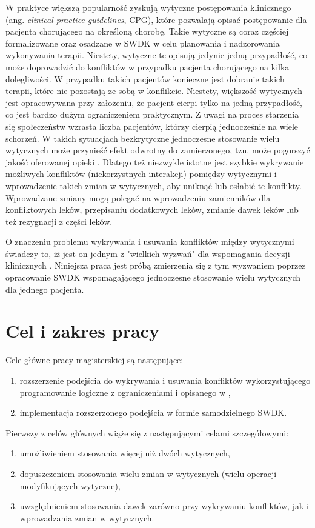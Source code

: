 \begin{spacing}{1.5}
W praktyce większą popularność zyskują wytyczne postępowania klinicznego (ang. \textit{clinical practice guidelines}, CPG), które pozwalają opisać postępowanie dla pacjenta chorującego na określoną chorobę. Takie wytyczne są coraz częściej formalizowane oraz osadzane w SWDK w celu planowania i nadzorowania wykonywania terapii. Niestety, wytyczne te opisują jedynie jedną przypadłość, co może doprowadzić do konfliktów w przypadku pacjenta chorującego na kilka dolegliwości. W przypadku takich pacjentów konieczne jest dobranie takich terapii, które nie pozostają ze sobą w konflikcie. Niestety, większość wytycznych jest opracowywana przy założeniu, że pacjent cierpi tylko na jedną przypadłość, co jest bardzo dużym ograniczeniem praktycznym. Z uwagi na proces starzenia się społeczeństw wzrasta liczba pacjentów, którzy cierpią jednocześnie na wiele schorzeń. W takich sytuacjach bezkrytyczne jednoczesne stosowanie wielu wytycznych może przynieść efekt odwrotny do zamierzonego, tzn. może pogorszyć jakość oferowanej opieki \cite{Boyd05}. Dlatego też niezwykle istotne jest szybkie wykrywanie możliwych konfliktów (niekorzystnych interakcji) pomiędzy wytycznymi i wprowadzenie takich zmian w wytycznych, aby uniknąć lub osłabić te konflikty. Wprowadzane zmiany mogą polegać na wprowadzeniu zamienników dla konfliktowych leków, przepisaniu dodatkowych leków, zmianie dawek leków lub też rezygnacji z części leków.

O znaczeniu problemu wykrywania i usuwania konfliktów między wytycznymi świadczy to, iż jest on jednym z "wielkich wyzwań" dla wspomagania decyzji klinicznych \cite{Sittig08}. Niniejsza praca jest próbą zmierzenia się z tym wyzwaniem poprzez opracowanie SWDK  wspomagającego jednoczesne stosowanie wielu wytycznych dla jednego pacjenta. 


\section{Cel i zakres pracy}

Cele główne pracy magisterskiej są następujące:
\begin{enumerate}
\item rozszerzenie podejścia do wykrywania i usuwania konfliktów wykorzystującego programowanie logiczne z ograniczeniami i opisanego w \cite{SzWilk2},
\item implementacja rozszerzonego podejścia w formie samodzielnego SWDK.
\end{enumerate}

Pierwszy z celów głównych wiąże się z następującymi celami szczegółowymi:
\begin{enumerate}
\item umożliwieniem stosowania więcej niż dwóch wytycznych, 
\item dopuszczeniem stosowania wielu zmian w wytycznych (wielu operacji modyfikujących wytyczne), 
\item uwzględnieniem stosowania dawek zarówno przy wykrywaniu konfliktów, jak i wprowadzania zmian w wytycznych.
\end{enumerate}


\end{spacing}
